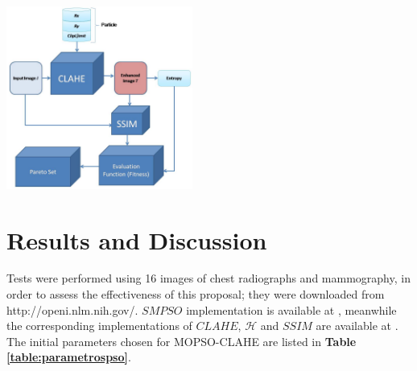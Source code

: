 \documentclass[spanish,twocolumn]{article}
\begin{document}
{\begin{minipage}[b]{1.0\linewidth}
\setlength{\abovecaptionskip}{2pt plus 3pt minus 2pt} %
  \vspace{0.4cm}
  \centering
  \centerline{\includegraphics[height=6cm]{Figures/particula_clahe2}}
  \vspace{0.4cm}
  \label{fig:particula_clahe}
  \vspace{-5pt}
\end{minipage}


\section{Results and Discussion}
\label{sec:resultadosdiscusion}

 Tests were performed using 16 images of chest radiographs and mammography, in order to assess the effectiveness of this proposal; they were downloaded from http://openi.nlm.nih.gov/. $SMPSO$ implementation is available at \cite{5586354}, meanwhile the corresponding implementations of $CLAHE$, $\mathscr{H}$ and $SSIM$ are available at \cite{opencv_library}. The initial parameters chosen for MOPSO-CLAHE are listed in \textbf{Table \ref{table:parametrospso}}.


}
\end{document}
